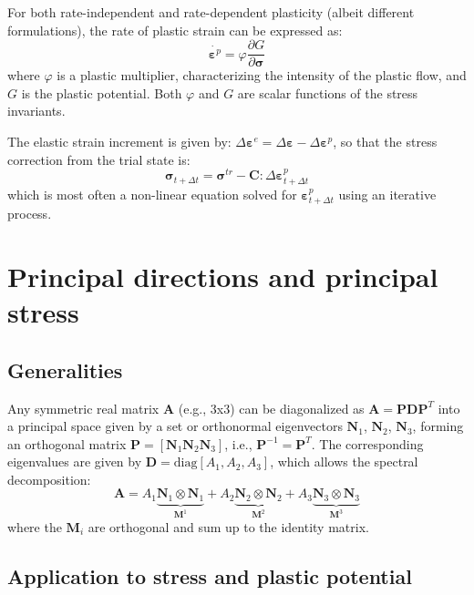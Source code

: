 \documentclass[letterpaper,12pt]{article}
\begin{document}
For both rate-independent and rate-dependent plasticity (albeit different formulations), the rate of plastic strain can be expressed as:
\begin{equation}
\dot{\boldsymbol{\varepsilon}^p} = \varphi\frac{\partial G}{\partial \boldsymbol{\sigma}}
\end{equation}
where $\varphi$ is a plastic multiplier, characterizing the intensity of the plastic flow, and $G$ is the plastic potential. Both $\varphi$ and $G$ are scalar functions of the stress invariants.

The elastic strain increment is given by: $\Delta \boldsymbol{\varepsilon}^e = \Delta \boldsymbol{\varepsilon} - \Delta \boldsymbol{\varepsilon}^p$, so that the stress correction from the trial state is:
\begin{equation}
\boldsymbol{\sigma}_{t+\Delta t} = \boldsymbol{\sigma}^{tr} - \boldsymbol{C}:\Delta \boldsymbol{\varepsilon}^p_{t+\Delta t}
\label{eq:corrected}
\end{equation}
which is most often a non-linear equation solved for $\boldsymbol{\varepsilon}^p_{t+\Delta t}$ using an iterative process.

\section{Principal directions and principal stress}

\subsection{Generalities}

Any symmetric real matrix $\mathbf{A}$ (e.g., 3x3) can be diagonalized as $\mathbf{A} = \mathbf{P}\mathbf{D}\mathbf{P}^T$ into a principal space given by a set or orthonormal eigenvectors $\mathbf{N}_1$, $\mathbf{N}_2$, $\mathbf{N}_3$, forming an orthogonal matrix $\mathbf{P} = [\mathbf{N}_1 \mathbf{N}_2 \mathbf{N}_3]$, i.e., $\mathbf{P}^{-1} = \mathbf{P}^T$. The corresponding eigenvalues are given by $\mathbf{D} = \mathrm{diag}[A_1, A_2, A_3]$, which allows the spectral decomposition:
\begin{equation}
\mathbf{A} = A_1 \underbrace{\mathbf{N}_1 \otimes \mathbf{N}_1}_{\mathbf{M}^1} + A_2 \underbrace{\mathbf{N}_2 \otimes \mathbf{N}_2}_{\mathbf{M}^2} + A_3 \underbrace{\mathbf{N}_3 \otimes \mathbf{N}_3}_{\mathbf{M}^3}
\label{eq:spectral}
\end{equation}
where the $\mathbf{M}_i$ are orthogonal and sum up to the identity matrix.
\subsection{Application to stress and plastic potential}
\end{document}
